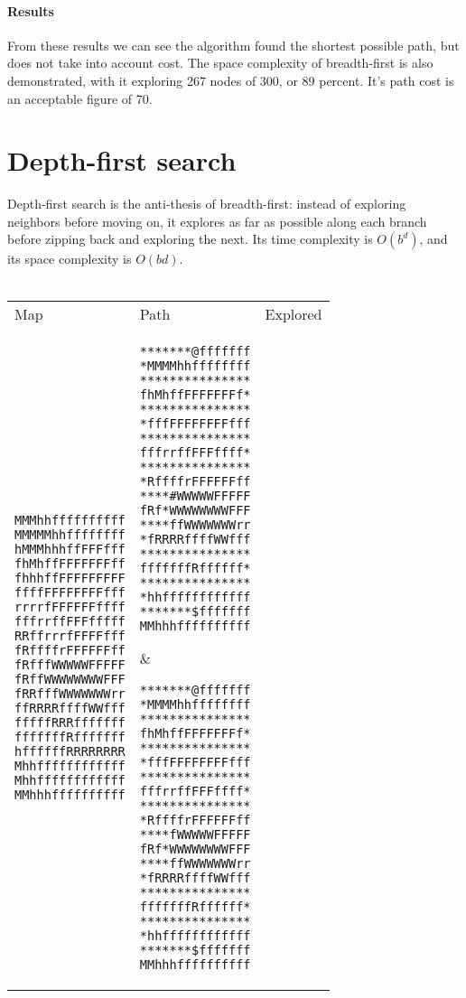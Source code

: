 \documentclass[12pt, article]{scrartcl}
\begin{document}
\paragraph{Results}
From these results we can see the algorithm found the shortest possible path, but does not take into account cost. The space complexity of breadth-first is also demonstrated, with it exploring 267 nodes of 300, or 89 percent. It's path cost is an acceptable figure of 70. \\

\section{Depth-first search}
Depth-first search is the anti-thesis of breadth-first: instead of exploring neighbors before moving on, it explores as far as possible along each branch before zipping back and exploring the next. Its time complexity is $O(b^d)$, and its space complexity is $O(bd)$. \\ \\
\begin{tabular}{p{2in} p{2in} p{2in}}
Map & Path & Explored \\

\begin{verbatim}
MMMhhffffffffff
MMMMMhhffffffff
hMMMhhhffFFFfff
fhMhffFFFFFFFff
fhhhffFFFFFFFFF
ffffFFFFFFFFfff
rrrrfFFFFFFffff
fffrrffFFFfffff
RRffrrrfFFFFfff
fRffffrFFFFFFff
fRfffWWWWWFFFFF
fRffWWWWWWWWFFF
fRRfffWWWWWWWrr
ffRRRRffffWWfff
fffffRRRfffffff
fffffffRfffffff
hffffffRRRRRRRR
Mhhffffffffffff
Mhhffffffffffff
MMhhhffffffffff
\end{verbatim}
&
\begin{verbatim}
*******@fffffff
*MMMMhhffffffff
***************
fhMhffFFFFFFFf*
***************
*fffFFFFFFFFfff
***************
fffrrffFFFffff*
***************
*RffffrFFFFFFff
****#WWWWWFFFFF
fRf*WWWWWWWWFFF
****ffWWWWWWWrr
*fRRRRffffWWfff
***************
fffffffRffffff*
***************
*hhffffffffffff
*******$fffffff
MMhhhffffffffff
\end{verbatim}
&
\begin{verbatim}
*******@fffffff
*MMMMhhffffffff
***************
fhMhffFFFFFFFf*
***************
*fffFFFFFFFFfff
***************
fffrrffFFFffff*
***************
*RffffrFFFFFFff
****fWWWWWFFFFF
fRf*WWWWWWWWFFF
****ffWWWWWWWrr
*fRRRRffffWWfff
***************
fffffffRffffff*
***************
*hhffffffffffff
*******$fffffff
MMhhhffffffffff
\end{verbatim}
\end{tabular}
\end{document}
